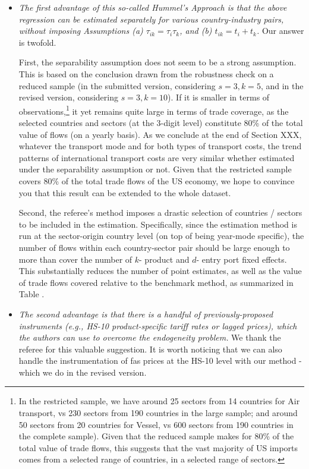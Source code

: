 \documentclass[a4paper,12pt]{article}
\begin{document}
\begin{itemize}
\item \textit{The first advantage of this so-called Hummel's Approach is that the above
regression can be estimated separately for various country-industry pairs, without
imposing Assumptions (a) $\tau_{ik} = \tau_i\tau_{k}$, and (b) $t_{ik} = t_i+ t_{k}$.} Our answer is twofold.

First, the separability assumption does not seem to be a strong assumption. This is based on the conclusion drawn from the robustness check on a reduced sample (in the submitted version, considering $s=3, k=5$, and in the revised version, considering $s=3, k=10$). If it is smaller in terms of observations,\footnote{In the restricted sample, we have around 25 sectors from 14 countries for Air transport, vs 230 sectors from 190 countries in the large sample; and around 50 sectors from 20 countries for Vessel, vs 600 sectors from 190 countries in the complete sample). Given that the reduced sample makes for 80\% of the total value of trade flows, this suggests that the vast majority of US imports comes from a selected range of countries, in a selected range of sectors.} it yet remains quite large in terms of trade coverage, as the selected countries and sectors (at the 3-digit level) constitute 80\% of the total value of flows (on a yearly basis). As we conclude at the end of Section XXX, whatever the transport mode and for both types of transport costs, the trend patterns of international transport costs are very similar whether estimated under the separability assumption or not. Given that the restricted sample covers 80\% of the total trade flows of the US economy, we hope to convince you that this result can be extended to the whole dataset.


Second, the referee's method imposes a drastic selection of countries / sectors to be included in the estimation. Specifically, since the estimation method is run at the sector-origin country level (on top of being year-mode specific), the number of flows within each country-sector pair should be large enough to more than cover the number of $k$- product and $d$- entry port fixed effects. This substantially reduces the number of point estimates, as well as the value of trade flows covered relative to the  benchmark method, as summarized in Table .



\item \textit{The second advantage is that there is a handful of previously-proposed instruments (e.g., HS-10 product-specific tariff rates or lagged prices), which the authors can use to overcome the endogeneity problem.}  We thank the referee for this valuable suggestion. It is worth noticing that we can also handle the instrumentation of fas prices at the HS-10 level with our method - which we do in the revised version.



\end{itemize}
\end{document}
